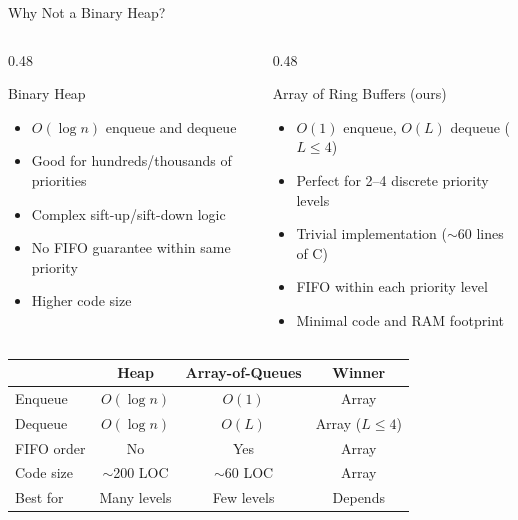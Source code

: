 \documentclass[aspectratio=169, 10pt]{beamer}
\begin{document}
\begin{frame}{Why Not a Binary Heap?}
\begin{columns}[T]
\begin{column}{0.48\textwidth}
\begin{block}{Binary Heap}
\begin{itemize}
  \item $O(\log n)$ enqueue and dequeue
  \item Good for hundreds/thousands of priorities
  \item Complex sift-up/sift-down logic
  \item No FIFO guarantee within same priority
  \item Higher code size
\end{itemize}
\end{block}
\end{column}

\begin{column}{0.48\textwidth}
\begin{block}{Array of Ring Buffers (ours)}
\begin{itemize}
  \item $O(1)$ enqueue, $O(L)$ dequeue ($L \leq 4$)
  \item Perfect for 2--4 discrete priority levels
  \item Trivial implementation ($\sim$60 lines of C)
  \item FIFO within each priority level
  \item Minimal code and RAM footprint
\end{itemize}
\end{block}
\end{column}
\end{columns}

\vspace{0.5em}
\begin{table}
\centering
\small
\begin{tabular}{@{}lccc@{}}
\toprule
& \textbf{Heap} & \textbf{Array-of-Queues} & \textbf{Winner} \\
\midrule
Enqueue     & $O(\log n)$  & $O(1)$    & Array \\
Dequeue     & $O(\log n)$  & $O(L)$    & Array ($L\leq4$) \\
FIFO order  & No           & Yes       & Array \\
Code size   & $\sim$200 LOC & $\sim$60 LOC & Array \\
Best for    & Many levels  & Few levels & Depends \\
\bottomrule
\end{tabular}
\end{table}
\end{frame}
\end{document}
